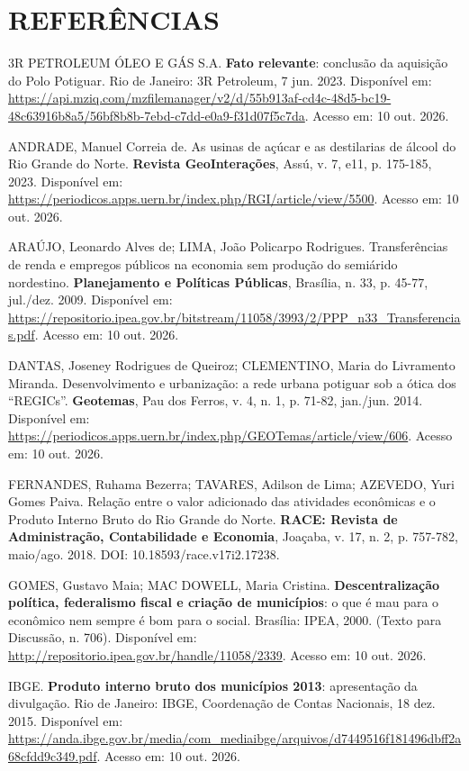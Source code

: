 \documentclass[12pt,a4paper]{article}
\newenvironment{referencias}{\begin{singlespace}\setlength{\parindent}{0pt}\setlength{\parskip}{4pt}\raggedright\footnotesize}{\end{singlespace}}
\begin{document}
\section*{REFERÊNCIAS}
\begin{referencias}

3R PETROLEUM ÓLEO E GÁS S.A. \textbf{Fato relevante}: conclusão da aquisição do Polo Potiguar. Rio de Janeiro: 3R Petroleum, 7 jun. 2023. Disponível em: \url{https://api.mziq.com/mzfilemanager/v2/d/55b913af-cd4c-48d5-bc19-48c63916b8a5/56bf8b8b-7ebd-c7dd-e0a9-f31d07f5c7da}. Acesso em: 10 out. 2026.

ANDRADE, Manuel Correia de. As usinas de açúcar e as destilarias de álcool do Rio Grande do Norte. \textbf{Revista GeoInterações}, Assú, v. 7, e11, p. 175-185, 2023. Disponível em: \url{https://periodicos.apps.uern.br/index.php/RGI/article/view/5500}. Acesso em: 10 out. 2026.

ARAÚJO, Leonardo Alves de; LIMA, João Policarpo Rodrigues. Transferências de renda e empregos públicos na economia sem produção do semiárido nordestino. \textbf{Planejamento e Políticas Públicas}, Brasília, n. 33, p. 45-77, jul./dez. 2009. Disponível em: \url{https://repositorio.ipea.gov.br/bitstream/11058/3993/2/PPP_n33_Transferencias.pdf}. Acesso em: 10 out. 2026.


DANTAS, Joseney Rodrigues de Queiroz; CLEMENTINO, Maria do Livramento Miranda. Desenvolvimento e urbanização: a rede urbana potiguar sob a ótica dos ``REGICs''. \textbf{Geotemas}, Pau dos Ferros, v. 4, n. 1, p. 71-82, jan./jun. 2014. Disponível em: \url{https://periodicos.apps.uern.br/index.php/GEOTemas/article/view/606}. Acesso em: 10 out. 2026.

FERNANDES, Ruhama Bezerra; TAVARES, Adilson de Lima; AZEVEDO, Yuri Gomes Paiva. Relação entre o valor adicionado das atividades econômicas e o Produto Interno Bruto do Rio Grande do Norte. \textbf{RACE: Revista de Administração, Contabilidade e Economia}, Joaçaba, v. 17, n. 2, p. 757-782, maio/ago. 2018. DOI: 10.18593/race.v17i2.17238.

GOMES, Gustavo Maia; MAC DOWELL, Maria Cristina. \textbf{Descentralização política, federalismo fiscal e criação de municípios}: o que é mau para o econômico nem sempre é bom para o social. Brasília: IPEA, 2000. (Texto para Discussão, n. 706). Disponível em: \url{http://repositorio.ipea.gov.br/handle/11058/2339}. Acesso em: 10 out. 2026.

IBGE. \textbf{Produto interno bruto dos municípios 2013}: apresentação da divulgação. Rio de Janeiro: IBGE, Coordenação de Contas Nacionais, 18 dez. 2015. Disponível em: \url{https://anda.ibge.gov.br/media/com_mediaibge/arquivos/d7449516f181496dbff2a68cfdd9c349.pdf}. Acesso em: 10 out. 2026.


\end{referencias}
\end{document}
